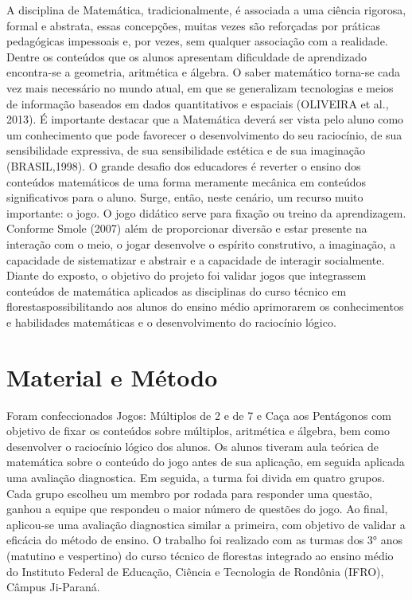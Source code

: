 \documentclass[article,12pt,onesidea,4paper,english,brazil]{abntex2}
\begin{document}
	A disciplina de Matemática, tradicionalmente, é associada a uma ciência rigorosa, formal e abstrata, essas concepções, muitas vezes são reforçadas por práticas pedagógicas impessoais e, por vezes, sem qualquer associação com a realidade. Dentre os conteúdos que os alunos apresentam dificuldade de aprendizado encontra-se a geometria, aritmética e álgebra.
	O saber matemático torna-se cada vez mais necessário no mundo atual, em que se generalizam tecnologias e meios de informação baseados em dados quantitativos e espaciais (OLIVEIRA et al., 2013). É importante destacar que a Matemática deverá ser vista pelo aluno como um conhecimento que pode favorecer o desenvolvimento do seu raciocínio, de sua sensibilidade expressiva, de sua sensibilidade estética e de sua imaginação (BRASIL,1998).
	O grande desafio dos educadores é reverter o ensino dos conteúdos matemáticos de uma forma meramente mecânica em conteúdos significativos para o aluno. Surge, então, neste cenário, um recurso muito importante: o jogo. O jogo didático serve para fixação ou treino da aprendizagem. Conforme Smole (2007) além de proporcionar diversão e estar presente na interação com o meio, o jogar desenvolve o espírito construtivo, a imaginação, a capacidade de sistematizar e abstrair e a capacidade de interagir socialmente.
	Diante do exposto, o objetivo do projeto foi validar jogos que integrassem conteúdos de matemática aplicados as disciplinas do curso técnico em florestaspossibilitando aos alunos do ensino médio aprimorarem os conhecimentos e habilidades matemáticas e o desenvolvimento do raciocínio lógico.
	
	\section*{Material e Método}
	
Foram confeccionados Jogos: Múltiplos de 2 e de 7 e Caça aos Pentágonos com objetivo de fixar os conteúdos sobre múltiplos, aritmética e álgebra, bem como desenvolver o raciocínio lógico dos alunos. Os alunos tiveram aula teórica de matemática sobre o conteúdo do jogo antes de sua aplicação, em seguida aplicada uma avaliação diagnostica. Em seguida, a turma foi divida em quatro grupos. Cada grupo escolheu um membro por rodada para responder uma questão, ganhou a equipe que respondeu o maior número de questões do jogo. Ao final, aplicou-se uma avaliação diagnostica similar a primeira, com objetivo de validar a eficácia do método de ensino.
O trabalho foi realizado com as turmas dos 3° anos (matutino e vespertino) do curso técnico de florestas integrado ao ensino médio do Instituto Federal de Educação, Ciência e Tecnologia de Rondônia (IFRO), Câmpus Ji-Paraná.
	
\end{document}
